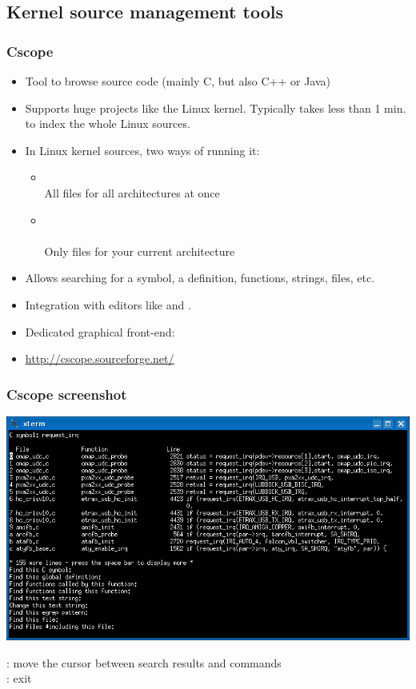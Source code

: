 \subsection{Kernel source management tools}

\begin{frame}
  \frametitle{Cscope}
  \begin{itemize}
  \item Tool to browse source code (mainly C, but also C++ or Java)
  \item Supports huge projects like the Linux kernel. Typically takes less
    than 1 min. to index the whole Linux sources.
  \item In Linux kernel sources, two ways of running it:
    \begin{itemize}
    \item {}\\
      All files for all architectures at once
    \item {}\\
      \\
      Only files for your current architecture
    \end{itemize}
  \item Allows searching for a symbol, a definition, functions,
    strings, files, etc.
  \item Integration with editors like  and .
  \item Dedicated graphical front-end: 
  \item \url{http://cscope.sourceforge.net/}
  \end{itemize}
\end{frame}

\begin{frame}
  \frametitle{Cscope screenshot}
  \begin{center}
    \includegraphics[width=\textwidth]{slides/kernel-source-code-management/cscope.png}
  \end{center}
  \code{[Tab]}: move the cursor between search results and commands\\
  \code{[Ctrl] [D]}: exit 
\end{frame}

